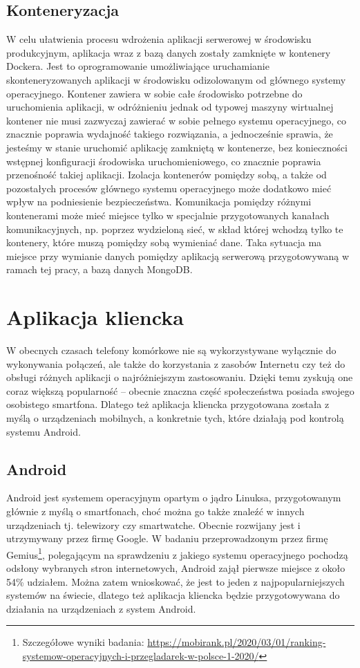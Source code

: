 \documentclass[a4paper,12pt,twoside,openany]{report}
\begin{document}
\subsection{Konteneryzacja}
W celu ułatwienia procesu wdrożenia aplikacji serwerowej w środowisku produkcyjnym, aplikacja wraz z bazą danych zostały zamknięte w kontenery Dockera. Jest to oprogramowanie  umożliwiające uruchamianie skonteneryzowanych aplikacji w środowisku odizolowanym od głównego systemy operacyjnego. Kontener zawiera w sobie całe środowisko potrzebne do uruchomienia aplikacji, w odróżnieniu jednak od typowej maszyny wirtualnej kontener nie musi zazwyczaj zawierać w sobie pełnego systemu operacyjnego, co znacznie poprawia wydajność takiego rozwiązania, a jednocześnie sprawia, że jesteśmy w stanie uruchomić aplikację zamkniętą w kontenerze, bez konieczności wstępnej konfiguracji środowiska uruchomieniowego, co znacznie poprawia przenośność takiej aplikacji. Izolacja kontenerów pomiędzy sobą, a także od pozostałych procesów głównego systemu operacyjnego może dodatkowo mieć wpływ na podniesienie bezpieczeństwa. Komunikacja pomiędzy różnymi kontenerami może mieć miejsce tylko w specjalnie przygotowanych kanałach komunikacyjnych, np. poprzez wydzieloną sieć, w skład której wchodzą tylko te kontenery, które muszą pomiędzy sobą wymieniać dane. Taka sytuacja ma miejsce przy wymianie danych pomiędzy aplikacją serwerową przygotowywaną w ramach tej pracy, a bazą danych MongoDB.


\section{Aplikacja kliencka}
W obecnych czasach telefony komórkowe nie są wykorzystywane wyłącznie do wykonywania połączeń, ale także do korzystania z zasobów Internetu czy też do obsługi różnych aplikacji o najróżniejszym zastosowaniu. Dzięki temu zyskują one coraz większą popularność -- obecnie znaczna część społeczeństwa posiada swojego osobistego smartfona. Dlatego też aplikacja kliencka przygotowana została z myślą o urządzeniach mobilnych, a konkretnie tych, które działają pod kontrolą systemu Android. 

\subsection{Android}
Android jest systemem operacyjnym opartym o jądro Linuksa, przygotowanym głównie z myślą o smartfonach, choć można go także znaleźć w innych urządzeniach tj. telewizory czy smartwatche. Obecnie rozwijany jest i utrzymywany przez firmę Google. W badaniu przeprowadzonym przez firmę Gemius\footnote{ Szczegółowe wyniki badania: \url{https://mobirank.pl/2020/03/01/ranking-systemow-operacyjnych-i-przegladarek-w-polsce-1-2020/}}, polegającym na sprawdzeniu z jakiego systemu operacyjnego pochodzą odsłony wybranych stron internetowych, Android zajął pierwsze miejsce z około 54\% udziałem. Można zatem wnioskować, że jest to jeden z najpopularniejszych systemów na świecie, dlatego też aplikacja kliencka będzie przygotowywana do działania na urządzeniach z system Android. 
 
\end{document}
